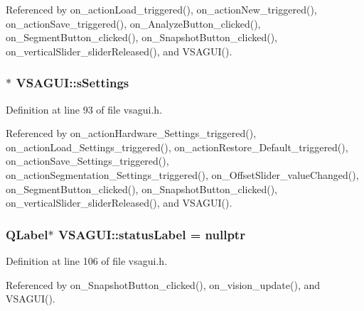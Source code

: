 Referenced by on\+\_\+action\+Load\+\_\+triggered(), on\+\_\+action\+New\+\_\+triggered(), on\+\_\+action\+Save\+\_\+triggered(), on\+\_\+\+Analyze\+Button\+\_\+clicked(), on\+\_\+\+Segment\+Button\+\_\+clicked(), on\+\_\+\+Snapshot\+Button\+\_\+clicked(), on\+\_\+vertical\+Slider\+\_\+slider\+Released(), and V\+S\+A\+G\+U\+I().

\hypertarget{class_v_s_a_g_u_i_a4a0358d00aa3cb520a9a1321962b0d4d}{}
\subsubsection[{s\+Settings}]{$\ast$ V\+S\+A\+G\+U\+I\+::s\+Settings\hspace{0.3cm}{\ttfamily [private]}}\label{class_v_s_a_g_u_i_a4a0358d00aa3cb520a9a1321962b0d4d}


Definition at line 93 of file vsagui.\+h.



Referenced by on\+\_\+action\+Hardware\+\_\+\+Settings\+\_\+triggered(), on\+\_\+action\+Load\+\_\+\+Settings\+\_\+triggered(), on\+\_\+action\+Restore\+\_\+\+Default\+\_\+triggered(), on\+\_\+action\+Save\+\_\+\+Settings\+\_\+triggered(), on\+\_\+action\+Segmentation\+\_\+\+Settings\+\_\+triggered(), on\+\_\+\+Offset\+Slider\+\_\+value\+Changed(), on\+\_\+\+Segment\+Button\+\_\+clicked(), on\+\_\+\+Snapshot\+Button\+\_\+clicked(), on\+\_\+vertical\+Slider\+\_\+slider\+Released(), and V\+S\+A\+G\+U\+I().

\hypertarget{class_v_s_a_g_u_i_a8cbaaa3b5e0975b7a1101b9bef3c9b57}{}
\subsubsection[{status\+Label}]{\setlength{\rightskip}{0pt plus 5cm}Q\+Label$\ast$ V\+S\+A\+G\+U\+I\+::status\+Label = nullptr\hspace{0.3cm}{\ttfamily [private]}}\label{class_v_s_a_g_u_i_a8cbaaa3b5e0975b7a1101b9bef3c9b57}


Definition at line 106 of file vsagui.\+h.



Referenced by on\+\_\+\+Snapshot\+Button\+\_\+clicked(), on\+\_\+vision\+\_\+update(), and V\+S\+A\+G\+U\+I().

